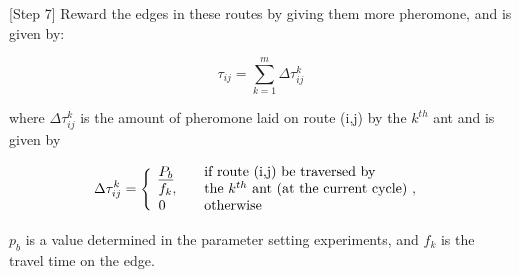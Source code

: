 [Step 7] Reward the edges in these routes by giving them more pheromone, and is given by:

$$ \tau_{ij} = \sum_{k=1}^{m} \Delta \tau^k_{ij}$$

where $ \Delta \tau^k_{ij} $ is the amount of pheromone laid on route (i,j) by the $k^{th}$ ant and is given by

$$
\Delta \tau^k_{ij} = \Bigg\{
\begin{array}{l l}
\underline{P_{b}} &  \quad \text{if route (i,j) be traversed by}\\
f_k, &  \quad \text{the $k^{th}$ ant (at the current cycle) , }\\
0 &  \quad \text{otherwise}
\end{array}
$$

$p_b$ is a value determined in the parameter setting experiments, and $f_k$ is the travel time on the edge.